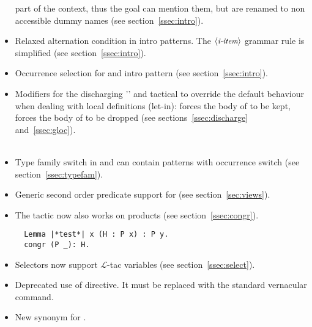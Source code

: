 \begin{itemize}
      part of the context, thus the goal can mention them, but are 
      renamed to non accessible dummy names (see section~\ref{ssec:intro}).\\
\item Relaxed alternation condition in intro patterns. The
      $\langle\mbox{\itshape\rmfamily\small i-item}\rangle$ grammar rule is simplified (see section~\ref{ssec:intro}).\\
\item Occurrence selection for \C{->} and \C{<-} intro pattern
       (see section~\ref{ssec:intro}).\\
\item Modifiers for the discharging '\C{:}' and  tactical to override 
      the default behaviour when dealing with local definitions (let-in):
       forces the body of  to be kept,  forces the body of
       to be dropped  (see sections~\ref{ssec:discharge} 
      and~\ref{ssec:gloc}).\\
      \\
\item Type family switch in  and 
      can contain patterns with occurrence switch
      (see section~\ref{ssec:typefam}).\\
\item Generic second order predicate support for 
      (see section~\ref{sec:views}).\\
\item The  tactic now also works on products (see
      section~\ref{ssec:congr}).
\begin{lstlisting}
  Lemma |*test*| x (H : P x) : P y. 
  congr (P _): H.
\end{lstlisting}
\item Selectors now support $\mathcal{L}$-tac variables 
      (see section~\ref{ssec:select}).\\
\item Deprecated use of  directive. 
      It must be replaced with the standard \Coq{}  vernacular command.
\item New synonym  for .
\end{itemize}

